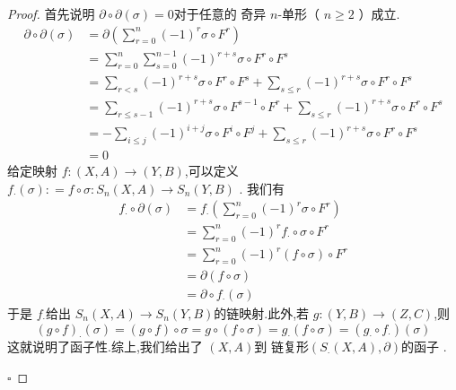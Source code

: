 \documentclass[../../几何与拓扑.tex]{subfiles}
\begin{document}
\begin{proof}
    首先说明 \(  \partial \circ \partial \left(  \sigma  \right)= 0   \)对于任意的 奇异 \(  n  \)-单形（ \(  n\ge 2  \) ）成立.   
    \[
    \begin{aligned}
     \partial \circ \partial \left(  \sigma  \right) & =  \partial \left( \sum _{r= 0}^{n}\left( -1 \right)^{r} \sigma \circ F^{r}  \right)\\ 
      & =  \sum _{r= 0}^{n}\sum _{s= 0}^{n-1} \left( -1 \right)^{r+ s}  \sigma \circ F^{r}\circ F^{s}\\ 
       & =   \sum _{r< s} \left( -1 \right)^{r+ s} \sigma \circ F^{r}\circ F^{s}+ \sum _{ s \le  r}\left( -1 \right)^{r+ s} \sigma \circ F^{r}\circ F^{s}   \\ 
        & =  \sum _{r\le s-1} \left( -1 \right)^{r+ s} \sigma \circ F^{s-1}\circ F^{r}+ \sum _{s\le  r}\left( -1 \right)^{r+ s} \sigma \circ F^{r}\circ F^{s}\\ 
         & =    -\sum _{i\le j} \left( -1 \right)^{i+ j} \sigma \circ F^{i}\circ F^{j}+\sum _{s\le r}\left( -1 \right)^{r+ s} \sigma \circ F^{r}\circ F^{s}\\
          & =  0 
    \end{aligned}
    \]
    给定映射 \( f: \left( X,A \right)  \to \left( Y,B \right)  \),可以定义 \(  f_{\cdot }\left(  \sigma  \right): = f\circ  \sigma : S_{n}\left( X,A \right)\to S_{n}\left( Y,B \right)       \) .
    我们有 \[
    \begin{aligned}
    f_{\cdot }\circ \partial \left(  \sigma  \right) &=  f_{\cdot }\left( \sum _{r= 0}^{n}\left( -1 \right)^{r} \sigma \circ F^{r}  \right)   \\ 
     & =  \sum _{r= 0}^{n} \left( -1 \right)^{r}f_{\cdot }\circ  \sigma \circ F^{r}\\ 
      & = \sum _{r= 0}^{n} \left( -1 \right)^{r} \left( f\circ  \sigma  \right)\circ F^{r}\\ 
       & =  \partial \left( f\circ  \sigma  \right)\\ 
        & =  \partial \circ f_{\cdot }\left(  \sigma  \right)    
    \end{aligned}
    \]于是 \(  f_{\cdot }  \)给出 \(  S_{n}\left( X,A \right)\to S_{n}\left( Y,B \right)    \)的链映射.此外,若 \(  g: \left( Y,B \right)\to \left( Z,C \right)    \),则 \[
    \left( g\circ f\right)_{\cdot }\left(  \sigma  \right) =  \left( g\circ f \right)   \circ  \sigma  =  g\circ \left( f\circ  \sigma  \right)=  g_{\cdot }\left( f\circ  \sigma  \right)= \left( g_{\cdot }\circ f_{\cdot } \right) \left(  \sigma  \right)   
    \]  这就说明了函子性.综上,我们给出了  \(  \left( X,A \right)   \)到 链复形\(  \left( S_{\cdot }\left( X,A \right),\partial   \right)   \)的函子  .
   
    \hfill $\square$
\end{proof}
\end{document}
